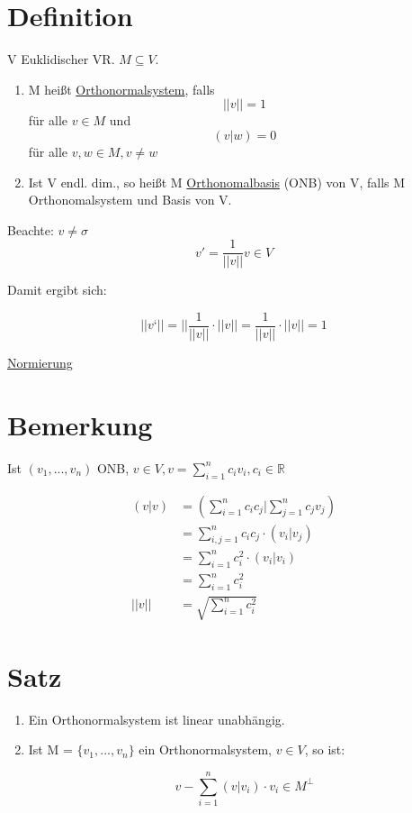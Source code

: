 \documentclass[a4paper, openany]{book}
\begin{document}
        \section{Definition}

        V Euklidischer VR. $M \subseteq V$.

        \begin{enumerate}[label=(\alph*)]
          \item M heißt \underline{Orthonormalsystem}, falls \[ ||v|| = 1 \] für alle $v \in M$ und \[ (v|w) = 0 \] für alle $v,w \in M, v \neq w$

          \item Ist V endl. dim., so heißt M \underline{Orthonomalbasis} (ONB) von V, falls M Orthonomalsystem und Basis von V.
        \end{enumerate}

        Beachte: $v \neq \sigma$ \[ v' = \frac{1}{||v||}  v \in V \]

        Damit ergibt sich:

        \[ ||v‘|| = || \frac{1}{||v||} \cdot ||v|| = \frac{1}{||v||} \cdot ||v|| = 1 \]

        \underline{Normierung}

        \section{Bemerkung}

        Ist $(v_1, ..., v_n)$ ONB, $v \in V, v = \sum_{i=1}^n c_iv_i, c_i \in \mathbb{R}$

        \begin{align*}
          (v|v) & = (\sum_{i=1}^n c_ic_j | \sum_{j=1}^n c_jv_j) \\
                & = \sum_{i,j=1}^n c_ic_j \cdot (v_i|v_j)  \\
                & = \sum_{i=1}^n c_i^2 \cdot (v_i|v_i) \\
                & = \sum_{i=1}^n c_i^2 \\
          ||v|| & = \sqrt{\sum_{i=1}^n c_i^2}
        \end{align*}

        \section{Satz}

        \begin{enumerate}[label=(\alph*)]
          \item Ein Orthonormalsystem ist linear unabhängig.

          \item Ist M = $\{v_1, ..., v_n \}$ ein Orthonormalsystem, $v \in V$, so ist:

          \[ v - \sum_{i=1}^n (v|v_i) \cdot v_i \in M^{\perp} \]
        \end{enumerate}
\end{document}
